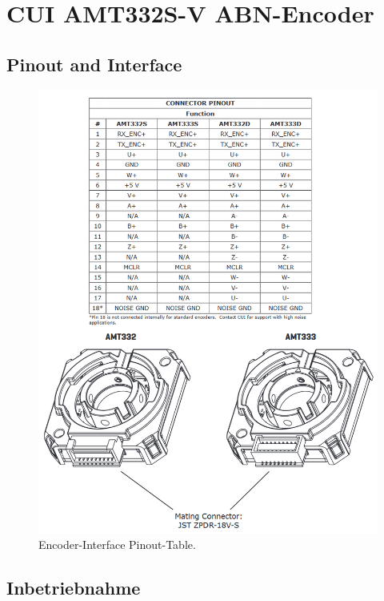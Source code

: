 \section{CUI AMT332S-V ABN-Encoder}\label{Appendix:ABC_Ecoder}

\subsection{Pinout and Interface}

\begin{figure}[H]
	\centering
	\includegraphics[width=\textwidth]{graphics/Encoder_Interface}
	\caption{Encoder-Interface Pinout-Table.\cite[S.5]{cui_devices_cui_2019}}
	\label{fig:Encoder_Interface}
\end{figure}

\newpage

\subsection{Inbetriebnahme}

